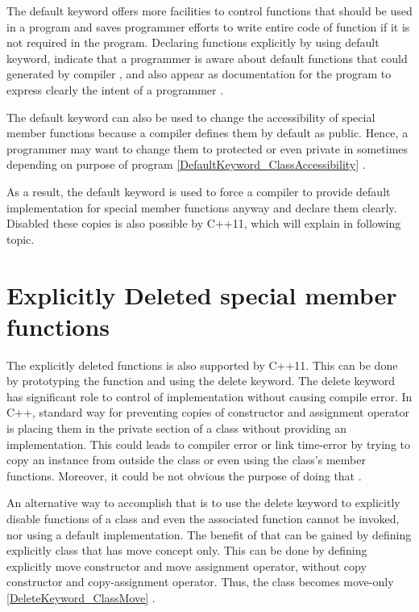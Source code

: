 \documentclass[11pt]{report}
\begin{document}
The default keyword offers more facilities to control functions that should be used in a program and saves programmer efforts to write entire code of function if it is not required in the program.  Declaring functions  explicitly by using default keyword, indicate  that  a programmer is  aware about  default functions that could generated by compiler , and also appear as documentation for the program to express clearly  the intent of a programmer \cite{Horstmann:2008:BC}.


The default keyword can also be used to change the accessibility of special member functions because a compiler defines them by default as public. Hence, a programmer may want to change them to protected or even private in sometimes depending on purpose of program \ref{DefaultKeyword_ClassAccessibility} \cite{Williams:2012:CCA}.


As a result, the default keyword is used to force a compiler to provide default implementation for special member functions anyway and declare them clearly. Disabled these copies is also possible by C++11, which will explain in following topic.


\section{Explicitly Deleted special member functions}
\label{section: Deleted special member functions}
The explicitly deleted functions is also supported by C++11. This can be done by prototyping the function and using the delete keyword. The delete keyword has significant role to control of implementation without causing compile error. In C++, standard way for preventing copies of constructor and assignment operator is placing them in the private section of a class without providing an implementation. This could leads to compiler error or link time-error by trying to copy an instance from outside the class or even using the class's member functions. Moreover, it could be not obvious the purpose of doing that \cite{Horstmann:2008:BC}.


An alternative way to accomplish that is to use the delete keyword to explicitly disable functions of a class and even the associated function cannot be invoked, nor using a default implementation. The benefit of that can be gained by defining explicitly class that has move concept only. This can be done by defining explicitly move constructor and move assignment operator, without copy constructor and copy-assignment operator. Thus, the class becomes move-only \ref{DeleteKeyword_ClassMove} \cite{Horstmann:2008:BC}.
\end{document}
